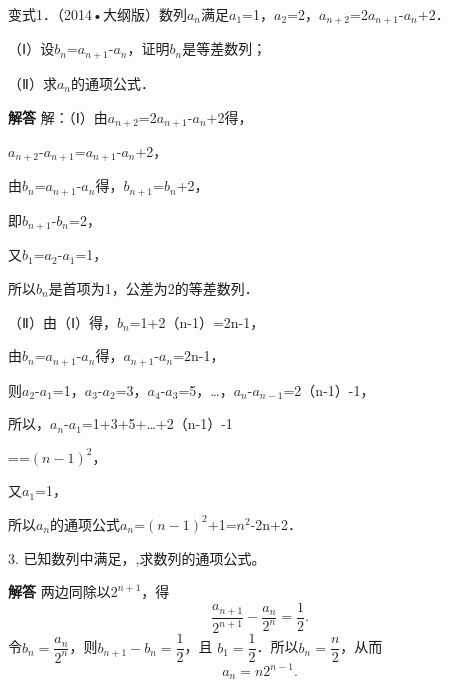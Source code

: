 变式1．（2014•大纲版）数列{\ensuremath{a_{n}}}满足\ensuremath{a_{1}}=1，\ensuremath{a_{2}}=2，\ensuremath{a_{n+2}}=2\ensuremath{a_{n+1}}-\ensuremath{a_{n}}+2．\par
（Ⅰ）设\ensuremath{b_{n}}=\ensuremath{a_{n+1}}-\ensuremath{a_{n}}，证明{\ensuremath{b_{n}}}是等差数列；\par
（Ⅱ）求{\ensuremath{a_{n}}}的通项公式．\par
\ifshowanswers
\par\begingroup\color{solutioncolor}\noindent\textbf{解答}\quad
解：（Ⅰ）由\ensuremath{a_{n+2}}=2\ensuremath{a_{n+1}}-\ensuremath{a_{n}}+2得，\par
\ensuremath{a_{n+2}}-\ensuremath{a_{n+1}}=\ensuremath{a_{n+1}}-\ensuremath{a_{n}}+2，\par
由\ensuremath{b_{n}}=\ensuremath{a_{n+1}}-\ensuremath{a_{n}}得，\ensuremath{b_{n+1}}=\ensuremath{b_{n}}+2，\par
即\ensuremath{b_{n+1}}-\ensuremath{b_{n}}=2，\par
又\ensuremath{b_{1}}=\ensuremath{a_{2}}-\ensuremath{a_{1}}=1，\par
所以{\ensuremath{b_{n}}}是首项为1，公差为2的等差数列．\par
（Ⅱ）由（Ⅰ）得，\ensuremath{b_{n}}=1+2（n-1）=2n-1，\par
由\ensuremath{b_{n}}=\ensuremath{a_{n+1}}-\ensuremath{a_{n}}得，\ensuremath{a_{n+1}}-\ensuremath{a_{n}}=2n-1，\par
则\ensuremath{a_{2}}-\ensuremath{a_{1}}=1，\ensuremath{a_{3}}-\ensuremath{a_{2}}=3，\ensuremath{a_{4}}-\ensuremath{a_{3}}=5，\ldots{}，\ensuremath{a_{n}}-\ensuremath{a_{n-1}}=2（n-1）-1，\par
所以，\ensuremath{a_{n}}-\ensuremath{a_{1}}=1+3+5+\ldots{}+2（n-1）-1\par
==\ensuremath{(n-1)^{2}}，\par
又\ensuremath{a_{1}}=1，\par
所以{\ensuremath{a_{n}}}的通项公式\ensuremath{a_{n}}=\ensuremath{(n-1)^{2}}+1=\ensuremath{n^{2}}-2n+2．\par
\par\endgroup\fi

\par\medskip{}\par

\qquad{}\qquad{}3. 已知数列中满足，,求数列的通项公式。\par
\QuestionSpace{2.5cm}
\ifshowanswers
\par\begingroup\color{solutioncolor}\noindent\textbf{解答}\quad
两边同除以$2^{n+1}$，得
\[
\frac{a_{n+1}}{2^{n+1}}-\frac{a_n}{2^n}=\frac12.
\]
令$b_n=\dfrac{a_n}{2^n}$，则$b_{n+1}-b_n=\dfrac12$，且
$b_1=\dfrac12$．所以$b_n=\dfrac n2$，从而
\[
\boxed{a_n=n2^{n-1}}.
\]
\par\endgroup\fi

